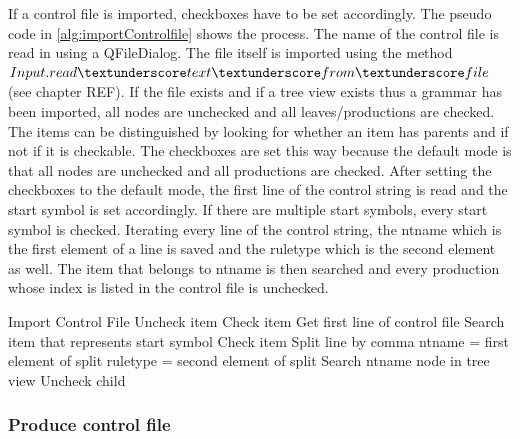 If a control file is imported, checkboxes have to be set accordingly. The pseudo code in \ref{alg:importControlfile} shows the process. 
The name of the control file is read in using a QFileDialog. The file itself is imported using the method $Input.read\textunderscore text\textunderscore from\textunderscore file$ (see chapter REF). If the file exists and if a tree view exists thus a grammar has been imported, all nodes are unchecked and all leaves/productions are checked. The items can be distinguished by looking for whether an item has parents and if not if it is checkable. The checkboxes are set this way because the default mode is that all nodes are unchecked and all productions are checked.  
After setting the checkboxes to the default mode, the first line of the control string is read and the start symbol is set accordingly. If there are multiple start symbols, every start symbol is checked.
Iterating every line of the control string, the nt\textunderscore name which is the first element of a line is saved and the rule\textunderscore type which is the second element as well. The item that belongs to nt\textunderscore name is then searched and every production whose index is listed in the control file is unchecked.

\begin{algorithm}[H]
\caption{GUI Pseudo Code: load\textunderscore controlfile}
\label{alg:importControlfile}
\begin{algorithmic}[1] 
\State Import Control File
			\State Uncheck item
		\EndIf
	\Else
		\State Check item 
	\EndIf
\EndFor
\State Get first line of control file
\State Search item that represents start symbol 
\State Check item
	\State Split line by comma
	\State nt\textunderscore name = first element of split
	\State rule\textunderscore type = second element of split
	\State Search nt\textunderscore name node in tree view
				\State Uncheck child
			\EndIf
		\EndFor
	\EndIf 
\EndFor
\EndIf
\end{algorithmic}
\end{algorithm} 

\subsubsection{Produce control file}\label{sec:ImplementationGUIProduceControlFile}

